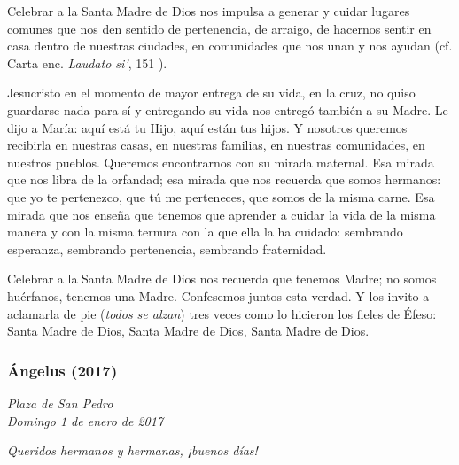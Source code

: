 Celebrar a la Santa Madre de Dios nos impulsa a generar y cuidar lugares comunes que nos den sentido de pertenencia, de arraigo, de hacernos sentir en casa dentro de nuestras ciudades, en comunidades que nos unan y nos ayudan (cf. Carta enc. \emph{Laudato si'}, 151 ).

Jesucristo en el momento de mayor entrega de su vida, en la cruz, no quiso guardarse nada para sí y entregando su vida nos entregó también a su Madre. Le dijo a María: aquí está tu Hijo, aquí están tus hijos. Y nosotros queremos recibirla en nuestras casas, en nuestras familias, en nuestras comunidades, en nuestros pueblos. Queremos encontrarnos con su mirada maternal. Esa mirada que nos libra de la orfandad; esa mirada que nos recuerda que somos hermanos: que yo te pertenezco, que tú me perteneces, que somos de la misma carne. Esa mirada que nos enseña que tenemos que aprender a cuidar la vida de la misma manera y con la misma ternura con la que ella la ha cuidado: sembrando esperanza, sembrando pertenencia, sembrando fraternidad.

Celebrar a la Santa Madre de Dios nos recuerda que tenemos Madre; no somos huérfanos, tenemos una Madre. Confesemos juntos esta verdad. Y los invito a aclamarla de pie (\emph{todos se alzan}) tres veces como lo hicieron los fieles de Éfeso: Santa Madre de Dios, Santa Madre de Dios, Santa Madre de Dios.

\subsubsection{Ángelus (2017)} \emph{Plaza de San Pedro\\ Domingo 1 de enero de 2017}



\emph{Queridos hermanos y hermanas, ¡buenos días!}

